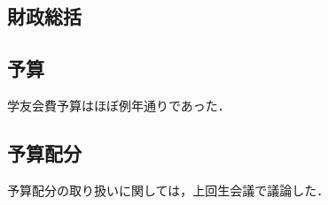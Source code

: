 \subsection*{財政総括}


\subsection*{予算}
学友会費予算はほぼ例年通りであった．

\subsection*{予算配分}
予算配分の取り扱いに関しては，上回生会議で議論した．
